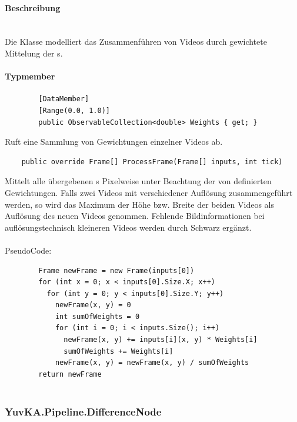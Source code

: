 \paragraph{Beschreibung}~\\
Die Klasse  modelliert das Zusammenführen von Videos durch gewichtete Mittelung der s.

\paragraph{Typmember}
\begin{itemize}

	\begin{verbatim}
		[DataMember]
		[Range(0.0, 1.0)]
		public ObservableCollection<double> Weights { get; }
	\end{verbatim}
	Ruft eine Sammlung von Gewichtungen einzelner Videos ab.

	\begin{verbatim}
	public override Frame[] ProcessFrame(Frame[] inputs, int tick)
	\end{verbatim}
	Mittelt alle übergebenen s Pixelweise unter Beachtung der von  definierten Gewichtungen. Falls zwei Videos mit verschiedener Auflösung zusammengeführt werden, so wird das Maximum der Höhe bzw. Breite der beiden Videos als Auflösung des neuen Videos genommen. Fehlende Bildinformationen bei auflösungstechnisch kleineren Videos werden durch Schwarz ergänzt.\\~\\
	PseudoCode:
	\begin{verbatim}
		Frame newFrame = new Frame(inputs[0])
		for (int x = 0; x < inputs[0].Size.X; x++)
		  for (int y = 0; y < inputs[0].Size.Y; y++)
		    newFrame(x, y) = 0
		    int sumOfWeights = 0
		    for (int i = 0; i < inputs.Size(); i++)
		      newFrame(x, y) += inputs[i](x, y) * Weights[i]
		      sumOfWeights += Weights[i]
		    newFrame(x, y) = newFrame(x, y) / sumOfWeights
		return newFrame
		
	\end{verbatim}
	
\end{itemize}

\subsubsection{YuvKA.Pipeline.DifferenceNode}

